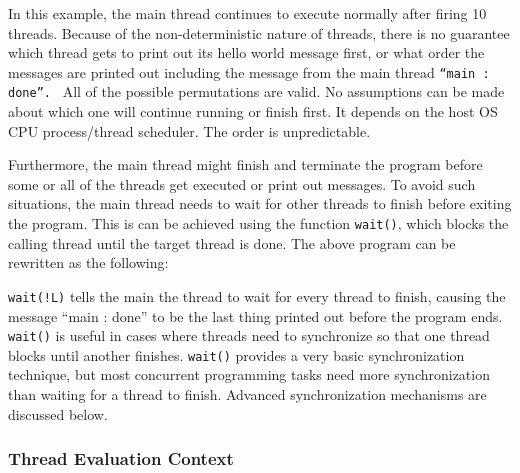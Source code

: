 In this example, the main thread continues to execute normally after
firing 10 threads. Because of the non-deterministic nature of threads,
there is no guarantee which thread gets to print out its hello world
message first, or what order the messages are printed out including the
message from the main thread
\texttt{{\textquotedblleft}}\texttt{main}\texttt{
}\texttt{:}\texttt{
}\texttt{done}\texttt{{\textquotedblright}}\texttt{.}
\ All of the possible permutations are valid. No assumptions can be
made about which one will continue running or finish first. It depends
on the host OS CPU process/thread scheduler. The order is
unpredictable.

Furthermore, the main thread might finish and terminate the program
before some or all of the threads get executed or print out messages.
To avoid such situations, the main thread needs to wait for other
threads to finish before exiting the program. This is can be achieved
using the function \texttt{wait()}, which blocks the calling
thread until the target thread is done. The above program can be
rewritten as the following:


\noindent
\texttt{wait(!L)} tells the main the thread to wait for
every thread to finish, causing the message {\textquotedblleft}main :
done{\textquotedblright} to be the last thing printed out before the
program ends. \texttt{wait()} is useful in cases
where threads need to synchronize so that one thread blocks until
another finishes. \texttt{wait()} provides a very basic
synchronization technique, but most concurrent programming tasks
need more synchronization than waiting for a thread to finish.
Advanced synchronization mechanisms are discussed below.


\subsubsection[Thread Evaluation Context]{Thread Evaluation Context}

